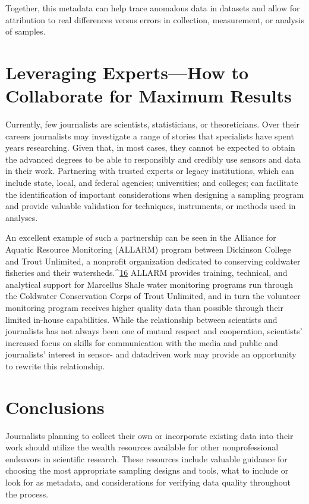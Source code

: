 \begin{itemize}
\begin{itemized}
Together, this metadata can help trace anomalous data in datasets and allow
for attribution to real differences versus errors in collection, measurement,
or analysis of samples.

\section{Leveraging Experts—How to Collaborate for Maximum Results}
Currently, few journalists are scientists, statisticians, or theoreticians. Over
their careers journalists may investigate a range of stories that specialists
have spent years researching. Given that, in most cases, they cannot
be expected to obtain the advanced degrees to be able to responsibly and
credibly use sensors and data in their work. Partnering with trusted experts
or legacy institutions, which can include state, local, and federal agencies;
universities; and colleges; can facilitate the identification of important considerations
when designing a sampling program and provide valuable validation
for techniques, instruments, or methods used in analyses.

An excellent example of such a partnership can be seen in the Alliance for
Aquatic Resource Monitoring (ALLARM) program between Dickinson College
and Trout Unlimited, a nonprofit organization dedicated to conserving
coldwater fisheries and their watersheds.^{\href{#endnotes-stauffer}{16}} ALLARM provides training,
technical, and analytical support for Marcellus Shale water monitoring programs
run through the Coldwater Conservation Corps of Trout Unlimited,
and in turn the volunteer monitoring program receives higher quality data
than possible through their limited in-house capabilities. While the relationship
between scientists and journalists has not always been one of mutual
respect and cooperation, scientists' increased focus on skills for communication
with the media and public and journalists' interest in sensor- and datadriven
work may provide an opportunity to rewrite this relationship.

\section{Conclusions}
Journalists planning to collect their own or incorporate existing data into
their work should utilize the wealth resources available for other nonprofessional
endeavors in scientific research. These resources include valuable
guidance for choosing the most appropriate sampling designs and tools,
what to include or look for as metadata, and considerations for verifying
data quality throughout the process.


\end{itemized}
\end{itemize}
